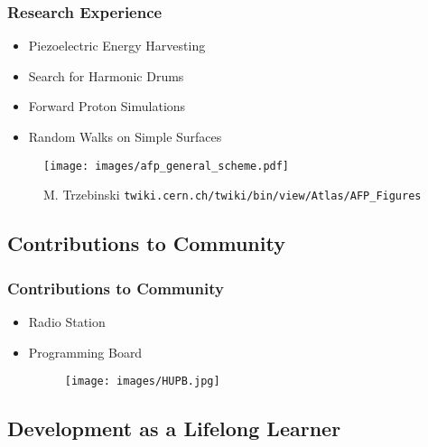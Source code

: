 \documentclass{beamer}
\begin{document}
\begin{frame}
\frametitle{Research Experience}

\begin{itemize}
	\item Piezoelectric Energy Harvesting
	\item Search for Harmonic Drums
	\item Forward Proton Simulations
	\item Random Walks on Simple Surfaces
\end{itemize}

\begin{figure}
	\texttt{[image: images/afp\_general\_scheme.pdf]}
	\caption{M. Trzebinski \texttt{twiki.cern.ch/twiki/bin/view/Atlas/AFP\_Figures} }
\end{figure}

\end{frame}


\subsection{Contributions to Community}

\begin{frame}
\frametitle{Contributions to Community}

\begin{itemize}
	\item Radio Station
	\begin{figure}[htp]
		\centering
		\quad
	\end{figure}
	\item Programming Board
	\begin{figure}[htp]
		\texttt{[image: images/HUPB.jpg]}
	\end{figure}
\end{itemize}

\end{frame}


\subsection{Development as a Lifelong Learner}
\end{document}
